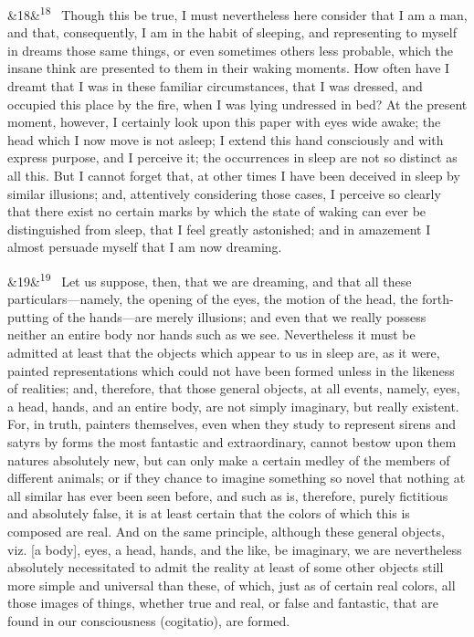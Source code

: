 \documentclass[12pt]{article}
\newcommand{\para}[1][]{\par\noindent\ifx&#1&\else\textsuperscript{\footnotesize #1}~\fi}
\begin{document}
\para[18] Though this be true, I must nevertheless here consider that I am a man, and that, consequently, I am in the habit of sleeping, and representing to myself in dreams those same things, or even sometimes others less probable, which the insane think are presented to them in their waking moments. How often have I dreamt that I was in these familiar circumstances, that I was dressed, and occupied this place by the fire, when I was lying undressed in bed? At the present moment, however, I certainly look upon this paper with eyes wide awake; the head which I now move is not asleep; I extend this hand consciously and with express purpose, and I perceive it; the occurrences in sleep are not so distinct as all this. But I cannot forget that, at other times I have been deceived in sleep by similar illusions; and, attentively considering those cases, I perceive so clearly that there exist no certain marks by which the state of waking can ever be distinguished from sleep, that I feel greatly astonished; and in amazement I almost persuade myself that I am now dreaming.

\para[19] Let us suppose, then, that we are dreaming, and that all these particulars---namely, the opening of the eyes, the motion of the head, the forth-putting of the hands---are merely illusions; and even that we really possess neither an entire body nor hands such as we see. Nevertheless it must be admitted at least that the objects which appear to us in sleep are, as it were, painted representations which could not have been formed unless in the likeness of realities; and, therefore, that those general objects, at all events, namely, eyes, a head, hands, and an entire body, are not simply imaginary, but really existent. For, in truth, painters themselves, even when they study to represent sirens and satyrs by forms the most fantastic and extraordinary, cannot bestow upon them natures absolutely new, but can only make a certain medley of the members of different animals; or if they chance to imagine something so novel that nothing at all similar has ever been seen before, and such as is, therefore, purely fictitious and absolutely false, it is at least certain that the colors of which this is composed are real. And on the same principle, although these general objects, viz. [a body], eyes, a head, hands, and the like, be imaginary, we are nevertheless absolutely necessitated to admit the reality at least of some other objects still more simple and universal than these, of which, just as of certain real colors, all those images of things, whether true and real, or false and fantastic, that are found in our consciousness (cogitatio), are formed.
\end{document}
